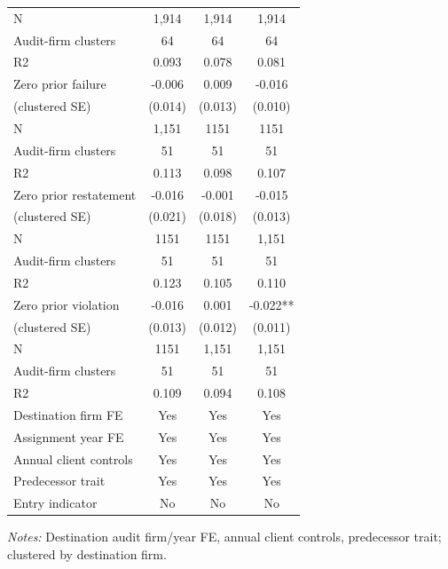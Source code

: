 \documentclass[10pt]{article}
\begin{document}
\begin{minipage}{19cm}
\begin{threeparttable}
\begin{tabular}{p{}ccc}
N & 1,914 & 1,914 & 1,914 \\
Audit-firm clusters & 64 & 64 & 64 \\
R2 & 0.093 & 0.078 & 0.081 \\
Zero prior failure & -0.006 & 0.009 & -0.016 \\
(clustered SE) & (0.014) & (0.013) & (0.010) \\
N & 1,151 & 1151 & 1151 \\
Audit-firm clusters & 51 & 51 & 51 \\
R2 & 0.113 & 0.098 & 0.107 \\
Zero prior restatement & -0.016 & -0.001 & -0.015 \\
(clustered SE) & (0.021) & (0.018) & (0.013) \\
N & 1151 & 1151 & 1,151 \\
Audit-firm clusters & 51 & 51 & 51 \\
R2 & 0.123 & 0.105 & 0.110 \\
Zero prior violation & -0.016 & 0.001 & -0.022** \\
(clustered SE) & (0.013) & (0.012) & (0.011) \\
N & 1151 & 1,151 & 1,151 \\
Audit-firm clusters & 51 & 51 & 51 \\
R2 & 0.109 & 0.094 & 0.108 \\
Destination firm FE & Yes & Yes & Yes \\
Assignment year FE & Yes & Yes & Yes \\
Annual client controls & Yes & Yes & Yes \\
Predecessor trait & Yes & Yes & Yes \\
Entry indicator & No & No & No \\
\bottomrule
\end{tabular}
\begin{tablenotes}\fontsize{9}{11}\selectfont
\item \raggedright \fontsize{9}{11}\selectfont \textit{Notes:} Destination audit firm/year FE, annual client controls, predecessor trait; clustered by destination firm.
\end{tablenotes}
\end{threeparttable}

\end{minipage}
\end{document}

